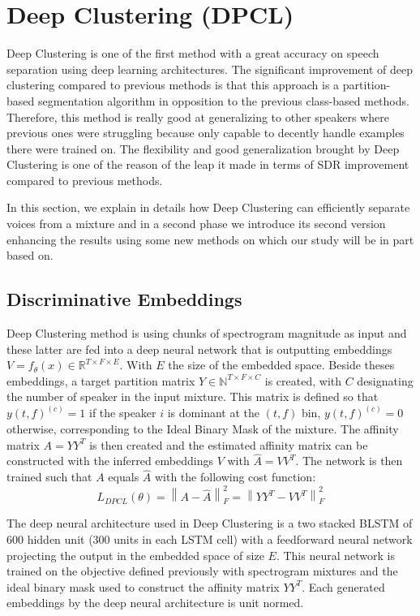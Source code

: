 \documentclass[master, tikz, final,11pt, dvipdfmx]{iscs-thesis}
\newcommand{\norm}[1]{\left\lVert#1\right\rVert}
\begin{document}
\section{Deep Clustering (DPCL)}

Deep Clustering \cite{DPCLV1,DPCLV2, DPCLEXT, chimera} is one of the first method with a great accuracy on speech separation using deep learning architectures. The significant improvement of deep clustering compared to previous methods is that this approach is a partition-based segmentation algorithm in opposition to the previous class-based methods. Therefore, this method is really good at generalizing to other speakers where previous ones were struggling because only capable to decently handle examples there were trained on. The flexibility and good generalization brought by Deep Clustering is one of the reason of the leap it made in terms of SDR improvement compared to previous methods.

In this section, we explain in details how Deep Clustering can efficiently separate voices from a mixture and in a second phase we introduce its second version enhancing the results using some new methods on which our study will be in part based on.

\subsection{Discriminative Embeddings}
\label{DE}

Deep Clustering method is using chunks of spectrogram magnitude as input and these latter are fed into a deep neural network that is outputting embeddings $V = f_\theta(x) \in \mathbb{R}^{T \times F \times E}$. With $E$ the size of the embedded space.
Beside theses embeddings, a target partition matrix $Y \in \mathbb{N}^{T \times F \times C}$ is created,  with $C$ designating the number of speaker in the input mixture. This matrix is defined so that $y(t,f)^{(c)} = 1$ if the speaker $i$ is dominant at the $(t,f)$ bin, $y(t,f)^{(c)} = 0$ otherwise, corresponding to the Ideal Binary Mask of the mixture. The affinity matrix $A = YY^{T}$ is then created and the estimated affinity matrix can be constructed with the inferred embeddings $V$ with $\hat{A}=VV^{T}$. The network is then trained such that $A$ equals $\hat{A}$ with the following cost function:
\[L_{DPCL}(\theta) = \norm{ A - \hat{A}}^2_F =  \norm{ YY^{T} - VV^{T}}^2_F \]
 
The deep neural architecture used in Deep Clustering is a two stacked BLSTM of 600 hidden unit (300 units in each LSTM cell) with a feedforward neural network projecting the output in the embedded space of size $E$. This neural network is trained on the objective defined previously with spectrogram mixtures and the ideal binary mask used to construct the affinity matrix $YY^T$. Each generated embeddings by the deep neural architecture is unit normed.
\end{document}
